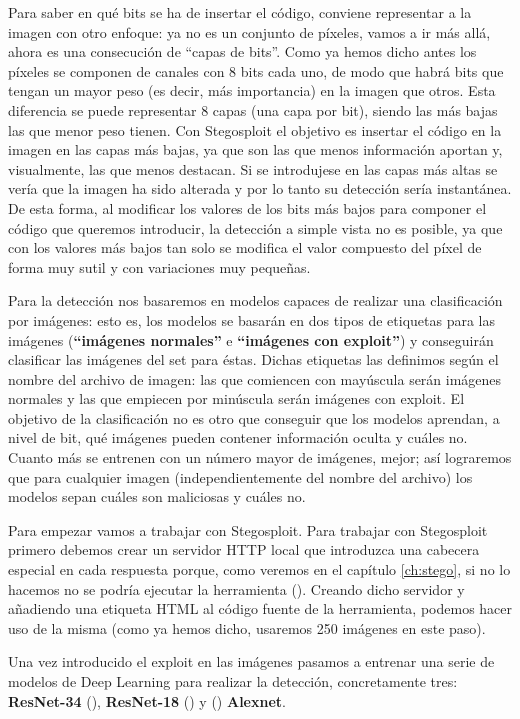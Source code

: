 Para saber en qué bits se ha de insertar el código, conviene representar a la imagen con otro enfoque: ya no es un conjunto de píxeles, vamos a ir más allá, ahora es una consecución de ``capas de bits''. Como ya hemos dicho antes los píxeles se componen de canales con 8 bits cada uno, de modo que habrá bits que tengan un mayor peso (es decir, más importancia) en la imagen que otros. Esta diferencia se puede representar 8 capas (una capa por bit), siendo las más bajas las que menor peso tienen. Con Stegosploit el objetivo es insertar el código en la imagen en las capas más bajas, ya que son las que menos información aportan y, visualmente, las que menos destacan. Si se introdujese en las capas más altas se vería que la imagen ha sido alterada y por lo tanto su detección sería instantánea. De esta forma, al modificar los valores de los bits más bajos para componer el código que queremos introducir, la detección a simple vista no es posible, ya que con los valores más bajos tan solo se modifica el valor compuesto del píxel de forma muy sutil y con variaciones muy pequeñas.

Para la detección nos basaremos en modelos capaces de realizar una clasificación por imágenes: esto es, los modelos se basarán en dos tipos de etiquetas para las imágenes (\textbf{``imágenes normales''} e \textbf{``imágenes con exploit''}) y conseguirán clasificar las imágenes del set para éstas. Dichas etiquetas las definimos según el nombre del archivo de imagen: las que comiencen con mayúscula serán imágenes normales y las que empiecen por minúscula serán imágenes con exploit. El objetivo de la clasificación no es otro que conseguir que los modelos aprendan, a nivel de bit, qué imágenes pueden contener información oculta y cuáles no. Cuanto más se entrenen con un número mayor de imágenes, mejor; así lograremos que para cualquier imagen (independientemente del nombre del archivo) los modelos sepan cuáles son maliciosas y cuáles no.

Para empezar vamos a trabajar con Stegosploit. Para trabajar con Stegosploit primero debemos crear un servidor HTTP local que introduzca una cabecera especial en cada respuesta porque, como veremos en el capítulo \ref{ch:stego}, si no lo hacemos no se podría ejecutar la herramienta (\cite{server-http}). Creando dicho servidor y añadiendo una etiqueta HTML al código fuente de la herramienta, podemos hacer uso de la misma (como ya hemos dicho, usaremos 250 imágenes en este paso).

Una vez introducido el exploit en las imágenes pasamos a entrenar una serie de modelos de Deep Learning para realizar la detección, concretamente tres: \textbf{ResNet-34} (\cite{resnet34}), \textbf{ResNet-18} (\cite{resnet18}) y (\cite{alexnet}) \textbf{Alexnet}.

